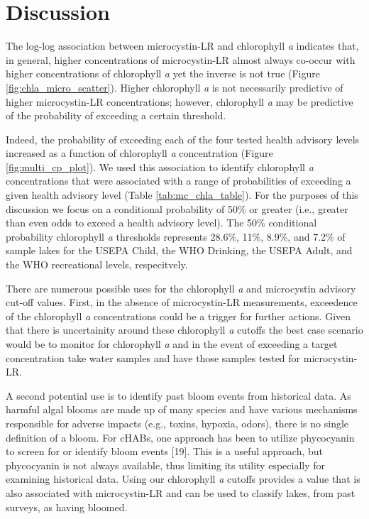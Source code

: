 \documentclass[11pt,]{article}
\begin{document}
\section{Discussion}\label{discussion}

The log-log association between microcystin-LR and chlorophyll \emph{a}
indicates that, in general, higher concentrations of microcystin-LR
almost always co-occur with higher concentrations of chlorophyll
\emph{a} yet the inverse is not true (Figure
\ref{fig:chla_micro_scatter}). Higher chlorophyll \emph{a} is not
necessarily predictive of higher microcystin-LR concentrations; however,
chlorophyll \emph{a} may be predictive of the probability of exceeding a
certain threshold.

Indeed, the probability of exceeding each of the four tested health
advisory levels increased as a function of chlorophyll \emph{a}
concentration (Figure \ref{fig:multi_cp_plot}). We used this association
to identify chlorophyll \emph{a} concentrations that were associated
with a range of probabilities of exceeding a given health advisory level
(Table \ref{tab:mc_chla_table}). For the purposes of this discussion we
focus on a conditional probability of 50\% or greater (i.e., greater
than even odds to exceed a health advisory level). The 50\% conditional
probability chlorophyll \emph{a} thresholds represents 28.6\%, 11\%,
8.9\%, and 7.2\% of sample lakes for the USEPA Child, the WHO Drinking,
the USEPA Adult, and the WHO recreational levels, respecitvely.

There are numerous possible uses for the chlorophyll \emph{a} and
microcystin advisory cut-off values. First, in the absence of
microcystin-LR measurements, exceedence of the chlorophyll \emph{a}
concentrations could be a trigger for further actions. Given that there
is uncertainity around these chlorophyll \emph{a} cutoffs the best case
scenario would be to monitor for chlorophyll \emph{a} and in the event
of exceeding a target concentration take water samples and have those
samples tested for microcystin-LR.

A second potential use is to identify past bloom events from historical
data. As harmful algal blooms are made up of many species and have
various mechanisms responsible for adverse impacts (e.g., toxins,
hypoxia, odors), there is no single definition of a bloom. For cHABs,
one approach has been to utilize phycocyanin to screen for or identify
bloom events {[}19{]}. This is a useful approach, but phycocyanin is not
always available, thus limiting its utility especially for examining
historical data. Using our chlorophyll \emph{a} cutoffs provides a value
that is also associated with microcystin-LR and can be used to classify
lakes, from past surveys, as having bloomed.
\end{document}

